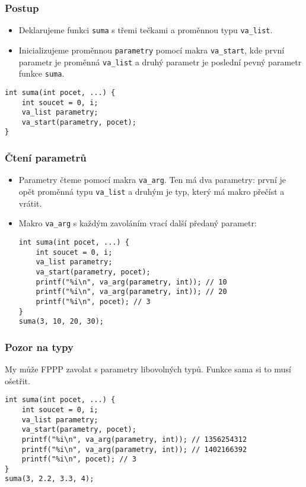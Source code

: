 \documentclass{beamer}
\newenvironment{itemizex}%
  {\large \begin{itemize}%
    \setlength{\itemsep}{8pt}%
    \setlength{\parskip}{8pt}}%
  {\end{itemize}}
\begin{document}
\begin{frame}[t,fragile]\frametitle{Postup} 
    \begin{itemizex}
        \item Deklarujeme funkci \texttt{suma} s třemi tečkami a proměnnou typu \texttt{va\_list}.
        \item Inicializujeme proměnnou \texttt{parametry} pomocí makra \texttt{va\_start}, kde první parametr je proměnná \texttt{va\_list} a druhý parametr je poslední pevný parametr funkce \texttt{suma}.
    \end{itemizex}
\begin{verbatim} 
int suma(int pocet, ...) {
    int soucet = 0, i;
    va_list parametry;
    va_start(parametry, pocet);
}
\end{verbatim}
\end{frame}


\begin{frame}[t,fragile]\frametitle{Čtení parametrů} 
    \begin{itemize}
        \item Parametry čteme pomocí makra \texttt{va\_arg}. Ten má dva parametry: první je opět proměnná typu \texttt{va\_list} a druhým je typ, který má makro přečíst a vrátit.
        \item Makro \texttt{va\_arg} s každým zavoláním vrací další předaný parametr:
\begin{verbatim} 
int suma(int pocet, ...) {
    int soucet = 0, i;
    va_list parametry;
    va_start(parametry, pocet);
    printf("%i\n", va_arg(parametry, int)); // 10
    printf("%i\n", va_arg(parametry, int)); // 20
    printf("%i\n", pocet); // 3
}
suma(3, 10, 20, 30);
\end{verbatim}
    \end{itemize}
\end{frame}


\begin{frame}[t,fragile]\frametitle{Pozor na typy} 
My může FPPP zavolat s parametry libovolných typů. Funkce sama si to musí ošetřit.

\begin{verbatim} 
int suma(int pocet, ...) {
    int soucet = 0, i;
    va_list parametry;
    va_start(parametry, pocet);
    printf("%i\n", va_arg(parametry, int)); // 1356254312
    printf("%i\n", va_arg(parametry, int)); // 1402166392
    printf("%i\n", pocet); // 3
}
suma(3, 2.2, 3.3, 4);
\end{verbatim}
\end{frame}
\end{document}

